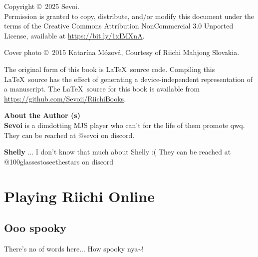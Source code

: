 \documentclass{book}
\begin{document}
\pagebreak
\thispagestyle{empty}

\noindent
{\small
Copyright \copyright ~2025 Sevoi.\\
Permission is granted to copy, distribute, and/or modify this document
under the terms of the Creative Commons Attribution NonCommercial 3.0 Unported License, available at \url{https://bit.ly/1xIMXnA}.

\vspace{.2in}
\noindent
Cover photo \copyright ~2015 Katar\'{i}na M\'{o}zov\'{a}, Courtesy of Riichi Mahjong Slovakia. 

\vspace{.2in}

\noindent
The original form of this book is \LaTeX\ source code.  Compiling this
\LaTeX\ source has the effect of generating a device-independent
representation of a manuscript. The \LaTeX\ source for this book is available from 
\url{https://github.com/Sevoii/RiichiBooks}.

\vfill
\noindent
{\large\bf About the Author (s)}\\

\noindent
{\bf Sevoi} is a dimdotting MJS player who can't for the life of them promote qwq.
They can be reached at @sevoi on discord.

\noindent
{\bf Shelly} ... I don't know that much about Shelly :(
They can be reached at @100glassestoseethestars on discord
} %

\pagebreak

\let\cleardoublepage\clearpage




%

%
%
\part{Playing Riichi Online} \label{part:online}

\chapter{Ooo spooky}
There's no of words here... How spooky nya\textasciitilde!
\end{document}
